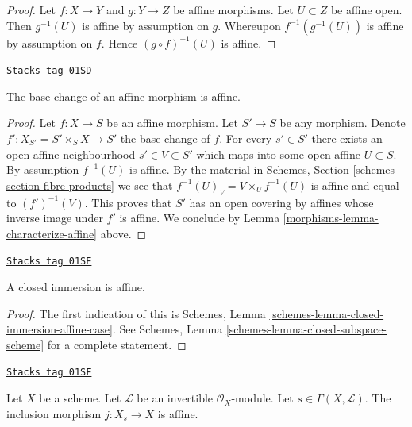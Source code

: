 \begin{proof}
Let $f : X \to Y$ and $g : Y \to Z$ be affine morphisms.
Let $U \subset Z$ be affine open. Then $g^{-1}(U)$ is affine
by assumption on $g$. Whereupon $f^{-1}(g^{-1}(U))$ is affine
by assumption on $f$. Hence $(g \circ f)^{-1}(U)$ is affine.
\end{proof}

\begin{lemma}
\label{morphisms-lemma-base-change-affine}
\href{https://stacks.math.columbia.edu/tag/01SD}{\texttt{Stacks tag 01SD}}

The base change of an affine morphism is affine.
\end{lemma}

\begin{proof}

Let $f : X \to S$ be an affine morphism. Let $S' \to S$ be any morphism.
Denote $f' : X_{S'} = S' \times_S X \to S'$ the base change of $f$.
For every $s' \in S'$ there exists an open affine neighbourhood
$s' \in V \subset S'$ which maps into some open affine $U \subset S$.
By assumption $f^{-1}(U)$ is affine. By the material in
Schemes, Section \ref{schemes-section-fibre-products} we see
that $f^{-1}(U)_V = V \times_U f^{-1}(U)$ is affine and equal
to $(f')^{-1}(V)$. This proves that $S'$ has an open covering by
affines whose inverse image under $f'$ is affine. We conclude
by Lemma \ref{morphisms-lemma-characterize-affine} above.
\end{proof}

\begin{lemma}
\label{morphisms-lemma-closed-immersion-affine}
\href{https://stacks.math.columbia.edu/tag/01SE}{\texttt{Stacks tag 01SE}}

A closed immersion is affine.
\end{lemma}

\begin{proof}
The first indication of this is
Schemes, Lemma \ref{schemes-lemma-closed-immersion-affine-case}.
See Schemes, Lemma \ref{schemes-lemma-closed-subspace-scheme}
for a complete statement.
\end{proof}

\begin{lemma}
\label{morphisms-lemma-affine-s-open}
\href{https://stacks.math.columbia.edu/tag/01SF}{\texttt{Stacks tag 01SF}}

Let $X$ be a scheme.
Let $\mathcal{L}$ be an invertible $\mathcal{O}_X$-module.
Let $s \in \Gamma(X, \mathcal{L})$.
The inclusion morphism $j : X_s \to X$ is affine.
\end{lemma}

